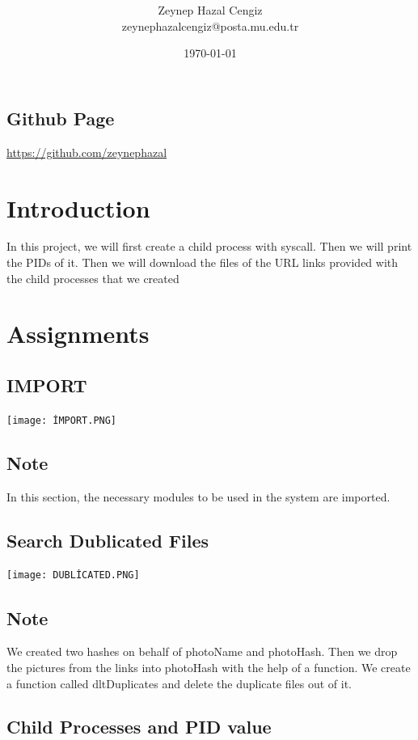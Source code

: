 \documentclass[onecolumn]{article}
\title{\spacecaps{Assignment Report 1: Process and Thread Implementation}\\ \normalsize \spacesc{CENG2034, Operating Systems} }
\author{Zeynep Hazal Cengiz\\zeynephazalcengiz@posta.mu.edu.tr}
\date{\today}
\begin{document}
\maketitle

\subsection*{Github Page}
\url{https://github.com/zeynephazal} 

\section{Introduction}

In this project, we will first create a child process with syscall. Then we will print the PIDs of it. Then we will download the files of the URL links provided with the child processes that we created

\section{Assignments}


\subsection{IMPORT}

\texttt{[image: İMPORT.PNG]}

\subsection*{Note} %
In this section, the necessary modules to be used in the system are imported.

\subsection{Search Dublicated Files}

\texttt{[image: DUBLİCATED.PNG]}
\subsection*{Note} %
We created two hashes on behalf of photoName and photoHash. Then we drop the pictures from the links into photoHash with the help of a function.
We create a function called dltDuplicates and delete the duplicate files out of it.

\subsection{Child Processes and PID value}
\end{document}
